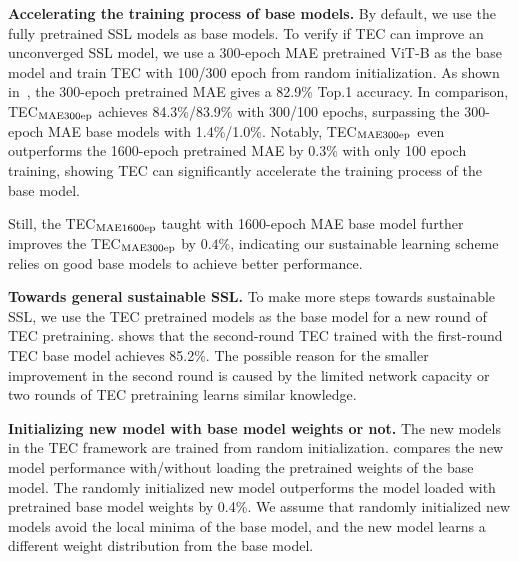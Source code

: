 \documentclass{article} \usepackage{iclr2023_conference,times}
\newcommand{\myPara}[1]{\vspace{-.05in} \noindent\textbf{#1}}
\begin{document}
\myPara{Accelerating the training process of base models.}
By default, we use the fully pretrained SSL models as base models.
To verify if TEC can improve an unconverged SSL model, we use a 300-epoch MAE pretrained ViT-B as the base model and train TEC with 100/300 epoch from random initialization.
As shown in~, the 300-epoch pretrained MAE gives a 82.9\% Top.1 accuracy.
In comparison, TEC$_{\rm MAE300ep}$ achieves 84.3\%/83.9\% with 300/100 epochs, surpassing the 300-epoch MAE base models with 1.4\%/1.0\%.
Notably, TEC$_{\rm MAE300ep}$ even outperforms the 1600-epoch pretrained MAE by 0.3\% with only 100 epoch training, showing TEC can significantly accelerate the training process of the base model.
\begin{wraptable}{r}{4.5cm}
	\vspace{-20pt}
	\caption{Towards general sustainable SSL 
	using the TEC as the new base model.}
		\label{tab:again}
		\centering
		\setlength{\tabcolsep}{0.3mm} \renewcommand{\arraystretch}{2.5}
		{ \fontsize{8pt}{3}}
	\vspace{-20pt}
	\end{wraptable}
Still, the TEC$_{\rm MAE1600ep}$ taught with 1600-epoch MAE base model further improves the TEC$_{\rm MAE300ep}$ by $0.4\%$,
indicating our sustainable learning scheme relies on good base models to achieve better performance.


\myPara{Towards general sustainable SSL.}
To make more steps towards sustainable SSL,  we use the TEC pretrained models as the base model for a new round of TEC pretraining.
 shows that the second-round TEC trained with the first-round TEC base model  achieves 85.2\%.
The possible reason for the smaller improvement in the second round is caused by the limited network capacity or 
two rounds of TEC pretraining learns similar knowledge.



\myPara{Initializing new model with base model weights or not.}
The new models in the TEC framework are trained from random initialization.
 compares the new model performance with/without loading the pretrained weights of the base model.
The randomly initialized new model outperforms the model loaded with pretrained base model weights by 0.4\%.
We assume that randomly initialized new models avoid the local minima of the base model,
and the new model learns a different weight distribution from the base model.
\end{document}
